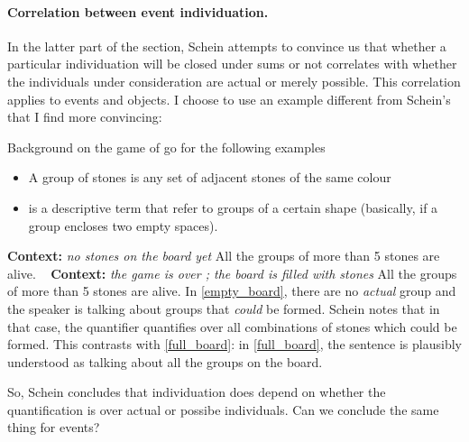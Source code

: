 \paragraph{Correlation between event individuation.} In the latter part of the section, Schein attempts to convince us that whether a particular individuation will be closed under sums or not correlates with whether the individuals under consideration are actual or merely possible. This correlation applies to events and objects. I choose to use an example different from Schein's that I find more convincing:

\begin{boxy}{Background on the game of go for the following examples}\\
\begin{itemize}
\item A group of stones is any set of adjacent stones of the same colour
\item {} is a descriptive term that refer to groups of a certain shape (basically, if a group encloses two empty spaces).
\end{itemize}
\end{boxy}

\pex\label{empty_board}
 \a \textbf{Context:}\emph{ no stones on the board yet}
 \a All the groups of more than 5 stones are alive.
 \xe
\pex~ \label{full_board}
\a \textbf{Context:} \emph{the game is over ; the board is filled with stones}
\a All the groups of more than 5 stones are alive.
\xe
%
In \cref{empty_board}, there are no \emph{actual} group and the speaker is talking about groups that \emph{could} be formed. Schein notes that in that case, the quantifier quantifies over all combinations of stones which could be formed. This contrasts with \cref{full_board}: in \cref{full_board}, the sentence is plausibly understood as talking about all the groups on the board.

So, Schein concludes that individuation does depend on whether the quantification is over actual or possibe individuals. Can we conclude the same thing for events?


